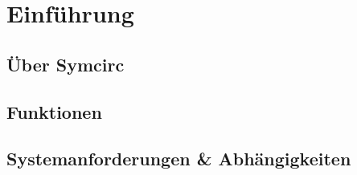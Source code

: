 \section{Einführung}
\subsection{Über Symcirc}
\subsection{Funktionen}
\subsection{Systemanforderungen \& Abhängigkeiten}